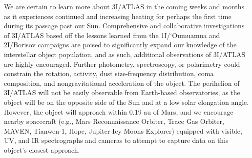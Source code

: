 \documentclass[twocolumn,longbib]{aastex7}
\begin{document}
\begin{CJK*}{UTF8}{gbsn}
We are certain to learn more about 3I/ATLAS in the coming weeks and months as it experiences continued and increasing heating for perhaps the first time during its passage past our Sun. Comprehensive and collaborative investigations of 3I/ATLAS based off the lessons learned from the 1I/`Oumuamua and 2I/Borisov campaigns are poised to significantly expand our knowledge of the interstellar object population, and as such, additional observations of 3I/ATLAS are highly encouraged.  Further photometry, spectroscopy, or polarimetry could constrain the rotation, activity, dust size-frequency distribution, coma composition, and nongravitational acceleration of the object. The perihelion of 3I/ATLAS will not be easily observable from Earth-based observatories, as the object will be on the opposite side of the Sun and at a low solar elongation angle. However, the object will approach within 0.19 au of Mars, and we encourage nearby spacecraft (e.g., Mars Reconnaissance Orbiter, Trace Gas Orbiter, MAVEN, Tianwen-1, Hope, Jupiter Icy Moons Explorer) equipped with visible, UV, and IR spectrographs and cameras to attempt to capture data on this object's closest approach.  %

\begin{acknowledgments}


\end{acknowledgments}
\end{CJK*}
\end{document}
